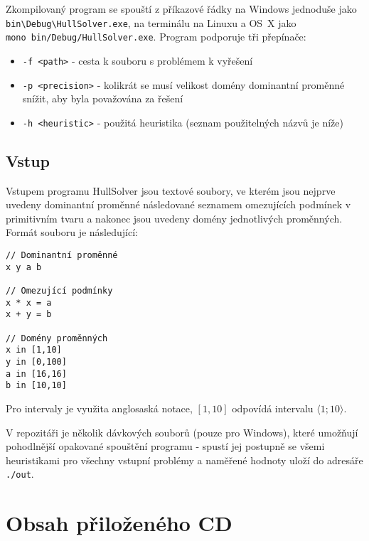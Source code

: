 \documentclass[thesis=B,czech]{FITthesis}[2012/06/26]
\theoremstyle{definition}
\begin{document}
Zkompilovaný program se spouští z příkazové řádky na Windows jednoduše jako \verb|bin\Debug\HullSolver.exe|, na terminálu na Linuxu a OS~X jako \\ \verb|mono bin/Debug/HullSolver.exe|. Program podporuje tři přepínače:

\begin{itemize}
    \item \verb|-f <path>| - cesta k souboru s problémem k vyřešení
    \item \verb|-p <precision>| - kolikrát se musí velikost domény dominantní proměnné snížit, aby byla považována za řešení
    \item \verb|-h <heuristic>| - použitá heuristika (seznam použitelných názvů je níže)
\end{itemize}

\section{Vstup}
Vstupem programu HullSolver jsou textové soubory, ve kterém jsou nejprve uvedeny dominantní proměnné následované seznamem omezujících podmínek v primitivním tvaru a nakonec jsou uvedeny domény jednotlivých proměnných. Formát souboru je následující:

\begin{verbatim}
// Dominantní proměnné
x y a b

// Omezující podmínky
x * x = a
x + y = b

// Domény proměnných
x in [1,10]
y in [0,100]
a in [16,16]
b in [10,10]
\end{verbatim}


Pro intervaly je využita anglosaská notace, $[1,10]$ odpovídá intervalu $\langle 1;10 \rangle$.

V repozitáři je několik dávkových souborů (pouze pro Windows), které umožňují pohodlnější opakované spouštění programu - spustí jej postupně se všemi heuristikami pro všechny vstupní problémy a naměřené hodnoty uloží do adresáře \verb|./out|.



\chapter{Obsah přiloženého CD}

\begin{figure}
\end{figure}
\end{document}
